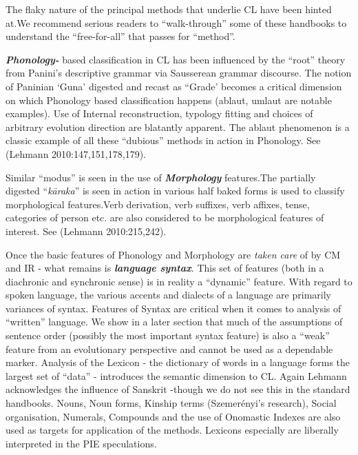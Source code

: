 The flaky nature of the principal methods that underlie CL have been hinted at.We recommend serious readers to “walk-through” some of these handbooks to understand the “free-for-all” that passes for “method”.

\textbf{\textit{Phonology-}} based classification in CL has been influenced by the “root” theory from Panini’s descriptive grammar via Sausserean grammar discourse. The notion of Paninian ‘Guna’ digested and recast as “Grade’ becomes a critical dimension on which Phonology based classification happens (ablaut, umlaut are notable examples). Use of Internal reconstruction, typology fitting and choices of arbitrary evolution direction are blatantly apparent. The ablaut phenomenon is a classic example of all these “dubious” methods in action in Phonology. See (Lehmann 2010:147,151,178,179).

Similar “modus” is seen in the use of \textbf{\textit{Morphology}} features.The partially digested “\textit{kāraka}” is seen in action in various half baked forms is used to classify morphological features.Verb derivation, verb suffixes, verb affixes, tense, categories of person etc. are also considered to be morphological features of interest. See (Lehmann 2010:215,242).

Once the basic features of Phonology and Morphology are \textit{taken care} of by CM and IR - what remains is \textbf{\textit{language syntax}}. This set of features (both in a diachronic and synchronic sense) is in reality a “dynamic” feature. With regard to spoken language, the various accents and dialects of a language are primarily variances of syntax. Features of Syntax are critical when it comes to analysis of “written” language. We show in a later section that much of the assumptions of sentence order (possibly the most important syntax feature) is also a “weak” feature from an evolutionary perspective and cannot be used as a dependable marker. Analysis of the Lexicon - the dictionary of words in a language forms the largest set of “data” - introduces the semantic dimension to CL. Again Lehmann acknowledges the influence of Sanskrit -though we do not see this in the standard handbooks. Nouns, Noun forms, Kinship terms (Szemerényi’s research), Social organisation, Numerals, Compounds and the use of Onomastic Indexes are also used as targets for application of the methods. Lexicons especially are liberally interpreted in the PIE speculations.

